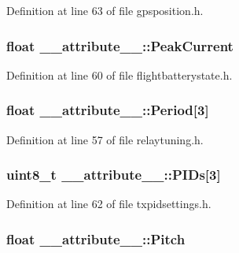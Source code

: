 \-Definition at line 63 of file gpsposition.\-h.

\hypertarget{struct____attribute_____af93f69401c47708e512e553823b48aa4}{
\subsubsection[{\-Peak\-Current}]{\setlength{\rightskip}{0pt plus 5cm}float {\bf \-\_\-\-\_\-attribute\-\_\-\-\_\-\-::\-Peak\-Current}}}\label{struct____attribute_____af93f69401c47708e512e553823b48aa4}


\-Definition at line 60 of file flightbatterystate.\-h.

\hypertarget{struct____attribute_____a460cc0f96b27e16732d3cce8a5454e7a}{
\subsubsection[{\-Period}]{\setlength{\rightskip}{0pt plus 5cm}float {\bf \-\_\-\-\_\-attribute\-\_\-\-\_\-\-::\-Period}\mbox{[}3\mbox{]}}}\label{struct____attribute_____a460cc0f96b27e16732d3cce8a5454e7a}


\-Definition at line 57 of file relaytuning.\-h.

\hypertarget{struct____attribute_____a89822f540a972a9667f1eee62a929647}{
\subsubsection[{\-P\-I\-Ds}]{\setlength{\rightskip}{0pt plus 5cm}uint8\-\_\-t {\bf \-\_\-\-\_\-attribute\-\_\-\-\_\-\-::\-P\-I\-Ds}\mbox{[}3\mbox{]}}}\label{struct____attribute_____a89822f540a972a9667f1eee62a929647}


\-Definition at line 62 of file txpidsettings.\-h.

\hypertarget{struct____attribute_____a8e0fe5f79dc339367a527d78c8ce85bc}{
\subsubsection[{\-Pitch}]{\setlength{\rightskip}{0pt plus 5cm}float {\bf \-\_\-\-\_\-attribute\-\_\-\-\_\-\-::\-Pitch}}}\label{struct____attribute_____a8e0fe5f79dc339367a527d78c8ce85bc}


